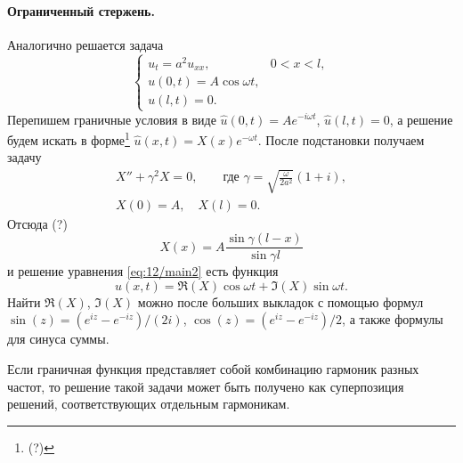 \paragraph{Ограниченный стержень.}
Аналогично решается задача  
\begin{equation}
  \label{eq:12/main2}
  \begin{cases}
    u_t = a^2 u_{xx}, & 0 < x < l,\\
    u(0, t) = A\cos\omega t,\\
    u(l, t) = 0.
  \end{cases}
\end{equation}
Перепишем граничные условия в виде $ \hat u(0, t) = Ae^{-i\omega t} $, $ \hat
u(l, t) = 0 $, а решение будем искать в форме\footnote{(?)} $ \hat u(x, t) =
X(x)e^{-\omega t} $. После подстановки получаем задачу
\begin{gather*}
  X'' + \gamma^2X =0,\qquad \text{где }\gamma = \sqrt{
  \frac{\omega}{2a^2}}(1+i),\\
  X(0) = A,\quad
  X(l) = 0.
\end{gather*}
Отсюда (?) 
\[
    X(x) = A \frac{\sin\gamma(l-x)}{\sin\gamma l}
\]
и решение уравнения \eqref{eq:12/main2} есть функция 
\[
  u(x, t) = \Re(X)\cos\omega t + \Im(X)\sin\omega t.
\]
Найти $ \Re(X) $, $ \Im(X) $ можно после больших выкладок с помощью формул $
\sin(z) = (e^{iz} - e^{-iz})/(2i) $, $ \cos(z)= (e^{iz} - e^{-iz})/2$, а также
формулы для синуса суммы.



Если граничная функция представляет собой комбинацию 
гармоник разных частот, то решение такой задачи может быть получено как
суперпозиция решений, соответствующих отдельным гармоникам.
